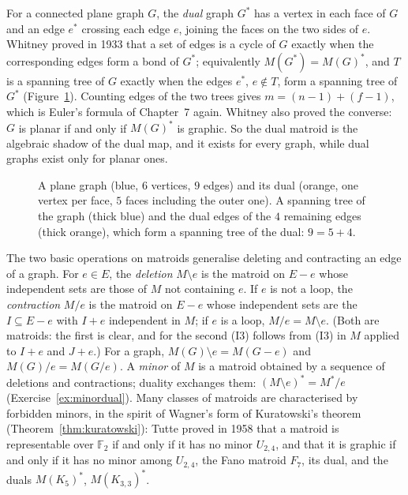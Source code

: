\begin{remark}
For a connected plane graph $G$, the \emph{dual} graph $G^*$ has a vertex in each face of $G$ and an edge $e^*$ crossing each edge $e$, joining the faces on the two sides of $e$. Whitney proved in 1933 that a set
of edges is a cycle of $G$ exactly when the corresponding edges form a bond of $G^*$; equivalently $M(G^*)=M(G)^*$, and $T$ is a spanning tree of $G$ exactly when the edges $e^*$, $e\notin T$, form a spanning tree of
$G^*$ (Figure~\ref{fig:dualtree}). Counting edges of the two trees gives $m=(n-1)+(f-1)$, which is Euler's formula of Chapter~7 again. Whitney also proved the converse: $G$ is planar if and only if $M(G)^*$ is graphic. So the
dual matroid is the algebraic shadow of the dual map, and it exists for every graph, while dual graphs exist only for planar ones.
\end{remark}

\begin{figure}[ht]
\centering
{}
\caption{A plane graph (blue, $6$ vertices, $9$ edges) and its dual (orange, one vertex per face, $5$ faces including the outer one). A spanning tree of the graph (thick blue) and the dual edges of the
$4$ remaining edges (thick orange), which form a spanning tree of the dual: $9=5+4$.}
\label{fig:dualtree}
\end{figure}

The two basic operations on matroids generalise deleting and contracting an edge of a graph. For $e\in E$, the \emph{deletion} $M\setminus e$ is the matroid on $E-e$ whose independent sets are those of $M$ not containing $e$.
If $e$ is not a loop, the \emph{contraction} $M/e$ is the matroid on $E-e$ whose independent sets are the $I\subseteq E-e$ with $I+e$ independent in $M$; if $e$ is a loop, $M/e=M\setminus e$. (Both are matroids: the
first is clear, and for the second (I3) follows from (I3) in $M$ applied to $I+e$ and $J+e$.) For a graph, $M(G)\setminus e=M(G-e)$ and $M(G)/e=M(G/e)$. A \emph{minor} of $M$ is a matroid obtained by a sequence of deletions and
contractions; duality exchanges them: $(M\setminus e)^*=M^*/e$ (Exercise~\ref{ex:minordual}). Many classes of matroids are characterised by forbidden minors, in the spirit of Wagner's form of Kuratowski's
theorem (Theorem~\ref{thm:kuratowski}): Tutte proved in 1958 that a matroid is representable over $\mathbb F_2$ if and only if it has no minor $U_{2,4}$, and that it is graphic if and only if it has no minor
among $U_{2,4}$, the Fano matroid $F_7$, its dual, and the duals $M(K_5)^*$, $M(K_{3,3})^*$.

